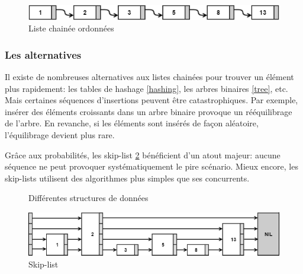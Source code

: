 \documentclass[hidelinks,a4paper, 12pt]{article}
\begin{document}
	\begin{figure}[h]
		\includegraphics[width=\textwidth]{img/linkedList}
		\caption{Liste chainée ordonnées}
		\label{LinkedList}
	\end{figure}
	
	\subsubsection*{Les alternatives}
	Il existe de nombreuses alternatives aux listes chainées pour trouver un élément plus rapidement: les tables de hashage \cref{hashing}, les arbres binaires \cref{tree}, etc. Mais certaines séquences d'insertions peuvent être catastrophiques. Par exemple, insérer des éléments croissants dans un arbre binaire provoque un rééquilibrage de l'arbre. En revanche, si les éléments sont insérés de façon aléatoire, l'équilibrage devient plus rare.

	Grâce aux probabilités, les \og skip-list \fg{} \cref{skip} bénéficient d'un atout majeur: aucune séquence ne peut provoquer systématiquement le pire scénario. Mieux encore, les skip-lists utilisent des algorithmes plus simples que ses concurrents.
	
	\begin{figure}[h]
		\centering
		\caption{Différentes structures de données}
	\end{figure}
	\begin{figure}
		\includegraphics[width=\textwidth]{img/skip}
		\caption{Skip-list}
		\label{skip}
	\end{figure}
	
\end{document}
